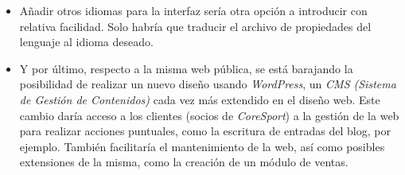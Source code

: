 \begin{itemize}
\item Añadir otros idiomas para la interfaz sería otra opción a introducir con relativa facilidad. Solo habría que traducir el archivo de propiedades del lenguaje al idioma deseado. 
\item Y por último, respecto a la misma web pública, se está barajando la posibilidad de realizar un nuevo diseño usando \textit{WordPress}, un \textit{CMS (Sistema de Gestión de Contenidos)} cada vez más extendido en el diseño web. Este cambio daría acceso a los clientes (socios de \textit{CoreSport}) a la gestión de la web para realizar acciones puntuales, como la escritura de entradas del blog, por ejemplo. También facilitaría el mantenimiento de la web, así como posibles extensiones de la misma, como la creación de un módulo de ventas. 
\end{itemize}


